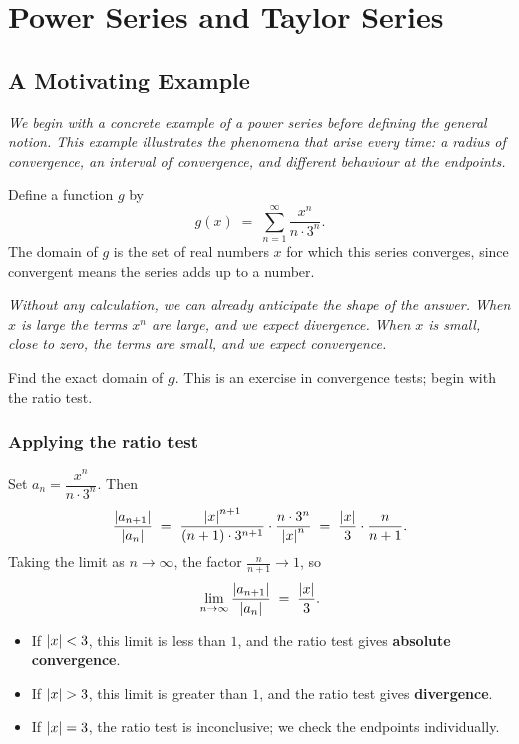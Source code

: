 \chapter{Power Series and Taylor Series}

\section{A Motivating Example}
\label{sec:14.1}

\textit{We begin with a concrete example of a power series before defining the general notion.  This example illustrates the phenomena that arise every time: a radius of convergence, an interval of convergence, and different behaviour at the endpoints.}

\begin{example}
\label{ex:14-1}
Define a function $g$ by
\[
  g(x) \;=\; \sum_{n=1}^{\infty}\frac{x^{n}}{n\cdot 3^{n}}.
\]
The domain of $g$ is the set of real numbers $x$ for which this series converges, since convergent means the series adds up to a number.
\end{example}

\textit{Without any calculation, we can already anticipate the shape of the answer.  When $x$ is large the terms $x^{n}$ are large, and we expect divergence.  When $x$ is small, close to zero, the terms are small, and we expect convergence.}

\begin{remark}
Find the exact domain of $g$.  This is an exercise in convergence tests; begin with the ratio test.
\end{remark}

\subsection*{Applying the ratio test}

Set $a_{n}=\dfrac{x^{n}}{n\cdot 3^{n}}$.  Then
\[
  \frac{\left\lvert a_{n+1} \right\rvert}{\left\lvert a_{n} \right\rvert}
  \;=\; \frac{\left\lvert x \right\rvert^{n+1}}{(n+1)\cdot 3^{n+1}}
        \cdot \frac{n\cdot 3^{n}}{\left\lvert x \right\rvert^{n}}
  \;=\; \frac{\left\lvert x \right\rvert}{3}\cdot\frac{n}{n+1}.
\]
Taking the limit as $n\to\infty$, the factor $\frac{n}{n+1}\to 1$, so
\[
  \lim_{n\to\infty}\frac{\left\lvert a_{n+1} \right\rvert}{\left\lvert a_{n} \right\rvert}
  \;=\; \frac{\left\lvert x \right\rvert}{3}.
\]

\begin{itemize}
  \item If $\left\lvert x \right\rvert<3$, this limit is less than $1$, and the ratio test gives \textbf{absolute convergence}.
  \item If $\left\lvert x \right\rvert>3$, this limit is greater than $1$, and the ratio test gives \textbf{divergence}.
  \item If $\left\lvert x \right\rvert=3$, the ratio test is inconclusive; we check the endpoints individually.
\end{itemize}

